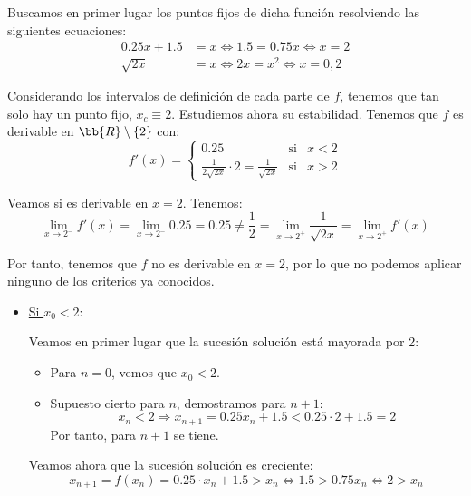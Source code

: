 \begin{ejercicio}
\begin{enumerate}
        Buscamos en primer lugar los puntos fijos de dicha función resolviendo las siguientes ecuaciones:
        \begin{align*}
            0.25x+1.5 &= x \Longleftrightarrow 1.5=0.75x \Longleftrightarrow x=2\\
            \sqrt{2x} &= x \Longleftrightarrow 2x = x^2 \Longleftrightarrow x=0,2
        \end{align*}

        Considerando los intervalos de definición de cada parte de $f$, tenemos que tan solo hay un punto fijo, $x_c\equiv 2$. Estudiemos ahora su estabilidad. Tenemos que $f$ es derivable en $\bb{R}\setminus \{2\}$ con:
        \begin{equation*}
            f'(x)=\left\{\begin{array}{lll}
            0.25 & \text{si} & x<2 \\
            \frac{1}{2\sqrt{2x}}\cdot 2 = \frac{1}{\sqrt{2x}} & \text{si} & x>2
        \end{array}\right.
        \end{equation*}

        Veamos si es derivable en $x=2$. Tenemos:
        \begin{equation*}
            \lim_{x\to 2^-}f'(x) = \lim_{x\to 2^-}0.25 = 0.25 \neq \frac{1}{2} = \lim_{x\to 2^+}\frac{1}{\sqrt{2x}} = \lim_{x\to 2^+} f'(x)
        \end{equation*}

        Por tanto, tenemos que $f$ no es derivable en $x=2$, por lo que no podemos aplicar ninguno de los criterios ya conocidos.
       \begin{itemize}
           \item \ul{Si $x_0<2$}:
           
           Veamos en primer lugar que la sucesión solución está mayorada por 2:
           \begin{itemize}
               \item Para $n=0$, vemos que $x_0<2$.
               \item Supuesto cierto para $n$, demostramos para $n+1$:
               \begin{equation*}
                   x_n < 2 \Longrightarrow x_{n+1} = 0.25x_n +1.5 < 0.25\cdot 2 +1.5 = 2
               \end{equation*}
               Por tanto, para $n+1$ se tiene.
           \end{itemize}

           Veamos ahora que la sucesión solución es creciente:
           \begin{equation*}
                x_{n+1} = f(x_n) = 0.25\cdot x_n + 1.5 > x_n\Longleftrightarrow
                1.5 > 0.75x_n \Longleftrightarrow 
                2 > x_n
            \end{equation*}
            

\end{itemize}
\end{enumerate}
\end{ejercicio}
